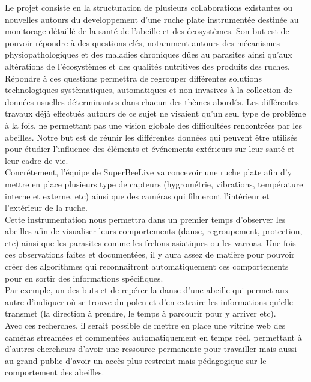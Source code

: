 \documentclass[11pt, french]{report}
\begin{document}
Le projet consiste en la structuration de plusieurs collaborations existantes ou nouvelles autours du developpement 
d’une ruche plate instrumentée destinée au monitorage détaillé de la santé de l’abeille et des écosystèmes. Son but est de
pouvoir répondre à des questions clés, notamment autours des mécanismes physiopathologiques et des maladies chroniques 
dûes au parasites ainsi qu’aux altérations de l’écosystèmes et des qualités nutritives des produits des ruches. \\
Répondre à ces questions permettra de regrouper différentes solutions technologiques systèmatiques, 
automatiques et non invasives à la collection de données usuelles déterminantes dans chacun des thèmes abordés.
Les différentes travaux déjà effectués autours de ce sujet ne visaient qu’un seul type de problème à la fois, 
ne permettant pas une vision globale des difficultées rencontrées par les abeilles. Notre but est de réunir les différentes
données qui peuvent être utilisés pour étudier l’influence des éléments et événements extérieurs sur leur santé et leur cadre de vie.\\

Concrétement, l'équipe de SuperBeeLive va concevoir une ruche plate afin d'y mettre en place plusieurs type de capteurs
(hygrométrie, vibrations, température interne et externe, etc) ainsi que des caméras qui filmeront l'intérieur et 
l'extérieur de la ruche. \\


Cette instrumentation nous permettra dans un premier temps d'observer les abeilles afin de visualiser leurs comportements 
(danse, regroupement, protection, etc) ainsi que les parasites comme les frelons asiatiques ou les varroas. %
Une fois ces observations faites et documentées, il y aura assez de matière pour pouvoir créer des algorithmes qui reconnaitront 
automatiquement ces comportements pour en sortir des informations spécifiques.\\
Par exemple, un des buts et de repérer la danse d'une abeille qui permet aux autre d'indiquer où se trouve du polen et d'en
extraire les informations qu'elle transmet (la direction à prendre, le temps à parcourir pour y arriver etc).\\
Avec ces recherches, il serait possible de mettre en place une vitrine web des caméras streamées et commentées 
automatiquement en temps réel, permettant à d'autres chercheurs d'avoir une ressource permanente pour travailler mais aussi
au grand public d'avoir un accès plus restreint mais pédagogique sur le comportement des abeilles. \\
\end{document}
